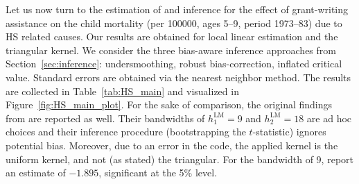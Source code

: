 Let us now turn to the estimation of and inference for the effect of grant-writing assistance on the child mortality
(per 100000, ages 5--9, period 1973--83) due to HS related causes.
Our results are obtained for local linear estimation and the triangular kernel.
We consider the three bias-aware inference approaches from Section~\ref{sec:inference}:
undersmoothing, robust bias-correction, inflated critical value.
Standard errors are obtained via the nearest neighbor method.
The results are collected in Table~\ref{tab:HS_main} and visualized in Figure~\ref{fig:HS_main_plot}.
For the sake of comparison, the original findings from \textcite[Table~III]{Ludwig_2007} are reported as well.
Their bandwidths of $h^{\text{LM}}_1 = 9$ and $h^{\text{LM}}_2 = 18$ are ad hoc choices and
their inference procedure (bootstrapping the $t$-statistic) ignores potential bias.
Moreover, due to an error in the code, the applied kernel is the uniform kernel, and not (as stated) the triangular.
For the bandwidth of 9, \citeauthor{Ludwig_2007} report an estimate of $-1.895$, significant at the 5\% level.

